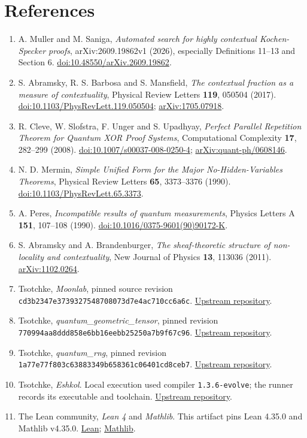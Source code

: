 \documentclass[10pt,a4paper]{article}
\providecommand{\tightlist}{\setlength{\itemsep}{0pt}\setlength{\parskip}{0pt}}
\begin{document}
\section{References}\label{references}

\begin{enumerate}
\def\labelenumi{\arabic{enumi}.}
\tightlist
\item
  A. Muller and M. Saniga, \emph{Automated search for highly contextual Kochen-Specker proofs}, arXiv:2609.19862v1 (2026), especially Definitions 11--13 and Section 6. \href{https://doi.org/10.48550/arXiv.2609.19862}{doi:10.48550/arXiv.2609.19862}.
\item
  S. Abramsky, R. S. Barbosa and S. Mansfield, \emph{The contextual fraction as a measure of contextuality}, Physical Review Letters \textbf{119}, 050504 (2017). \href{https://doi.org/10.1103/PhysRevLett.119.050504}{doi:10.1103/PhysRevLett.119.050504}; \href{https://arxiv.org/abs/1705.07918}{arXiv:1705.07918}.
\item
  R. Cleve, W. Slofstra, F. Unger and S. Upadhyay, \emph{Perfect Parallel Repetition Theorem for Quantum XOR Proof Systems}, Computational Complexity \textbf{17}, 282--299 (2008). \href{https://doi.org/10.1007/s00037-008-0250-4}{doi:10.1007/s00037-008-0250-4}; \href{https://arxiv.org/abs/quant-ph/0608146}{arXiv:quant-ph/0608146}.
\item
  N. D. Mermin, \emph{Simple Unified Form for the Major No-Hidden-Variables Theorems}, Physical Review Letters \textbf{65}, 3373--3376 (1990). \href{https://doi.org/10.1103/PhysRevLett.65.3373}{doi:10.1103/PhysRevLett.65.3373}.
\item
  A. Peres, \emph{Incompatible results of quantum measurements}, Physics Letters A \textbf{151}, 107--108 (1990). \href{https://doi.org/10.1016/0375-9601(90)90172-K}{doi:10.1016/0375-9601(90)90172-K}.
\item
  S. Abramsky and A. Brandenburger, \emph{The sheaf-theoretic structure of non-locality and contextuality}, New Journal of Physics \textbf{13}, 113036 (2011). \href{https://arxiv.org/abs/1102.0264}{arXiv:1102.0264}.
\item
  Tsotchke, \emph{Moonlab}, pinned source revision \texttt{cd3b2347e3739327548708073d7e4ac710cc6a6c}. \href{https://github.com/tsotchke/moonlab}{Upstream repository}.
\item
  Tsotchke, \emph{quantum\_geometric\_tensor}, pinned revision \texttt{770994aa8ddd858e6bb16eebb25250a7b9f67c96}. \href{https://github.com/tsotchke/quantum_geometric_tensor}{Upstream repository}.
\item
  Tsotchke, \emph{quantum\_rng}, pinned revision \texttt{1a77e77f803c63883349b658361c06401cd8ceb7}. \href{https://github.com/tsotchke/quantum_rng}{Upstream repository}.
\item
  Tsotchke, \emph{Eshkol}. Local execution used compiler \texttt{1.3.6-evolve}; the runner records its executable and toolchain. \href{https://github.com/tsotchke/eshkol}{Upstream repository}.
\item
  The Lean community, \emph{Lean 4} and \emph{Mathlib}. This artifact pins Lean 4.35.0 and Mathlib v4.35.0. \href{https://github.com/leanprover/lean4}{Lean}; \href{https://github.com/leanprover-community/mathlib4}{Mathlib}.
\end{enumerate}
\end{document}
